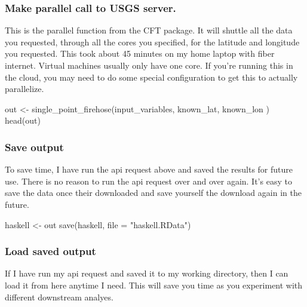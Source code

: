 \documentclass[
  paper=a4,
  ,captions=tableheading
]{scrartcl}
\newenvironment{Shaded}{\begin{snugshade}}{\end{snugshade}}
\newcommand{\AttributeTok}[1]{\textcolor[rgb]{0.77,0.63,0.00}{#1}}
\newcommand{\FunctionTok}[1]{\textcolor[rgb]{0.00,0.00,0.00}{#1}}
\newcommand{\NormalTok}[1]{#1}
\newcommand{\OtherTok}[1]{\textcolor[rgb]{0.56,0.35,0.01}{#1}}
\newcommand{\StringTok}[1]{\textcolor[rgb]{0.31,0.60,0.02}{#1}}
\begin{document}
\hypertarget{make-parallel-call-to-usgs-server.}{%
\subsubsection{Make parallel call to USGS
server.}\label{make-parallel-call-to-usgs-server.}}

This is the parallel function from the CFT package. It will shuttle all
the data you requested, through all the cores you specified, for the
latitude and longitude you requested. This took about 45 minutes on my
home laptop with fiber internet. Virtual machines usually only have one
core. If you're running this in the cloud, you may need to do some
special configuration to get this to actually parallelize.

\begin{Shaded}
\begin{Highlighting}[]
\NormalTok{out }\OtherTok{\textless{}{-}} \FunctionTok{single\_point\_firehose}\NormalTok{(input\_variables, known\_lat, known\_lon )}
\FunctionTok{head}\NormalTok{(out)}
\end{Highlighting}
\end{Shaded}

\hypertarget{save-output}{%
\subsubsection{Save output}\label{save-output}}

To save time, I have run the api request above and saved the results for
future use. There is no reason to run the api request over and over
again. It's easy to save the data once their downloaded and save
yourself the download again in the future.

\begin{Shaded}
\begin{Highlighting}[]
\NormalTok{haskell }\OtherTok{\textless{}{-}}\NormalTok{ out}
\FunctionTok{save}\NormalTok{(haskell, }\AttributeTok{file =} \StringTok{"haskell.RData"}\NormalTok{)}
\end{Highlighting}
\end{Shaded}

\hypertarget{load-saved-output}{%
\subsubsection{Load saved output}\label{load-saved-output}}

If I have run my api request and saved it to my working directory, then
I can load it from here anytime I need. This will save you time as you
experiment with different downstream analyes.
\end{document}
